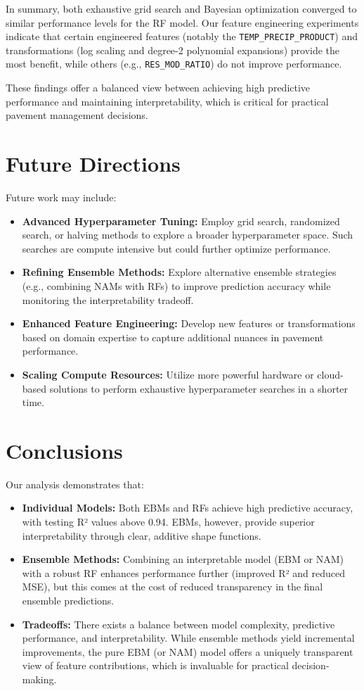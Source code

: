 \documentclass{article}
\begin{document}
\bigskip

\noindent In summary, both exhaustive grid search and Bayesian optimization converged to similar performance levels for the RF model. Our feature engineering experiments indicate that certain engineered features (notably the \texttt{TEMP\_PRECIP\_PRODUCT}) and transformations (log scaling and degree-2 polynomial expansions) provide the most benefit, while others (e.g., \texttt{RES\_MOD\_RATIO}) do not improve performance.

\bigskip

\noindent These findings offer a balanced view between achieving high predictive performance and maintaining interpretability, which is critical for practical pavement management decisions.


\section{Future Directions}
Future work may include:
\begin{itemize}
    \item \textbf{Advanced Hyperparameter Tuning:} Employ grid search, randomized search, or halving methods to explore a broader hyperparameter space. Such searches are compute intensive but could further optimize performance.
    \item \textbf{Refining Ensemble Methods:} Explore alternative ensemble strategies (e.g., combining NAMs with RFs) to improve prediction accuracy while monitoring the interpretability tradeoff.
    \item \textbf{Enhanced Feature Engineering:} Develop new features or transformations based on domain expertise to capture additional nuances in pavement performance.
    \item \textbf{Scaling Compute Resources:} Utilize more powerful hardware or cloud-based solutions to perform exhaustive hyperparameter searches in a shorter time.
\end{itemize}

\section{Conclusions}
Our analysis demonstrates that:
\begin{itemize}
    \item \textbf{Individual Models:} Both EBMs and RFs achieve high predictive accuracy, with testing R² values above 0.94. EBMs, however, provide superior interpretability through clear, additive shape functions.
    \item \textbf{Ensemble Methods:} Combining an interpretable model (EBM or NAM) with a robust RF enhances performance further (improved R² and reduced MSE), but this comes at the cost of reduced transparency in the final ensemble predictions.
    \item \textbf{Tradeoffs:} There exists a balance between model complexity, predictive performance, and interpretability. While ensemble methods yield incremental improvements, the pure EBM (or NAM) model offers a uniquely transparent view of feature contributions, which is invaluable for practical decision-making.
\end{itemize}
\end{document}
